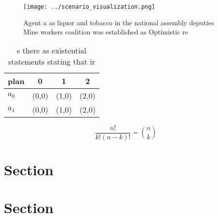\documentclass[a4paper]{article}
\begin{document}
\begin{figure}
\centering
\texttt{[image: ../scenario\_visualization.png]}
\caption{Agent a as liquor and tobacco in the national assembly deputies Mine workers coalition was established as Optimistic re
}
\end{figure}
 
\begin{table}
\begin{adjustbox}{width=0.6\columnwidth}
\begin{tabular}{|l|l|l|l|}
\hline
\textbf{plan} & \multicolumn{1}{c|}{\textbf{0}} & \multicolumn{1}{c|}{\textbf{1}} & \multicolumn{1}{c|}{\textbf{2}} \\ \hline
\textbf{$a_0$}  & (0,0) & (1,0) & (2,0) \\ \hline
\textbf{$a_1$}  & (0,0) & (1,0) & (2,0) \\ \hline
\end{tabular}
\end{adjustbox}
\caption{s there as existential statements stating that ir
}
\end{table}

\[ \frac{n!}{k!(n-k)!} = \binom{n}{k} \]

\section{Section}

\section{Section}
\end{document}
